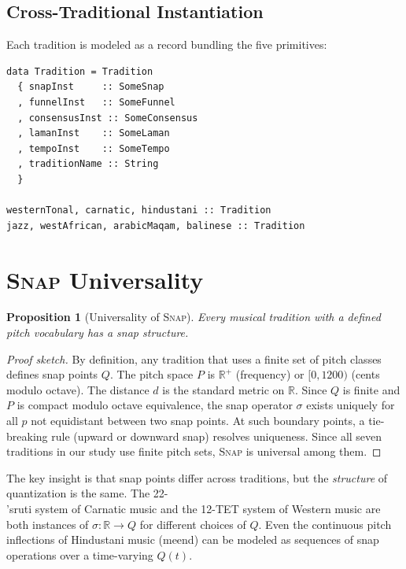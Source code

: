 \documentclass[cmj]{article}
\newtheorem{proposition}{Proposition}
\newcommand{\R}{\mathbb{R}}
\newcommand{\SNAP}{\textsc{Snap}}
\begin{document}
\subsection{Cross-Traditional Instantiation}

Each tradition is modeled as a record bundling the five primitives:

\begin{lstlisting}[style=haskell,caption={Tradition as a bundle of primitives}]
data Tradition = Tradition
  { snapInst     :: SomeSnap
  , funnelInst   :: SomeFunnel
  , consensusInst :: SomeConsensus
  , lamanInst    :: SomeLaman
  , tempoInst    :: SomeTempo
  , traditionName :: String
  }

westernTonal, carnatic, hindustani :: Tradition
jazz, westAfrican, arabicMaqam, balinese :: Tradition
\end{lstlisting}

\section{\SNAP{} Universality}
\label{sec:snap}

\begin{proposition}[Universality of \SNAP{}]
Every musical tradition with a defined pitch vocabulary has a snap structure.
\end{proposition}

\begin{proof}[Proof sketch]
By definition, any tradition that uses a finite set of pitch classes defines
snap points $Q$. The pitch space $P$ is $\R^+$ (frequency) or $[0, 1200)$
(cents modulo octave). The distance $d$ is the standard metric on $\R$. Since
$Q$ is finite and $P$ is compact modulo octave equivalence, the snap operator
$\sigma$ exists uniquely for all $p$ not equidistant between two snap points.
At such boundary points, a tie-breaking rule (upward or downward snap) resolves
uniqueness. Since all seven traditions in our study use finite pitch sets,
\SNAP{} is universal among them.
\end{proof}

The key insight is that snap points differ across traditions, but the
\emph{structure} of quantization is the same. The 22-\\'{s}ruti system of
Carnatic music and the 12-TET system of Western music are both instances of
$\sigma: \R \to Q$ for different choices of $Q$. Even the continuous pitch
inflections of Hindustani music (meend) can be modeled as sequences of snap
operations over a time-varying $Q(t)$.
\end{document}
